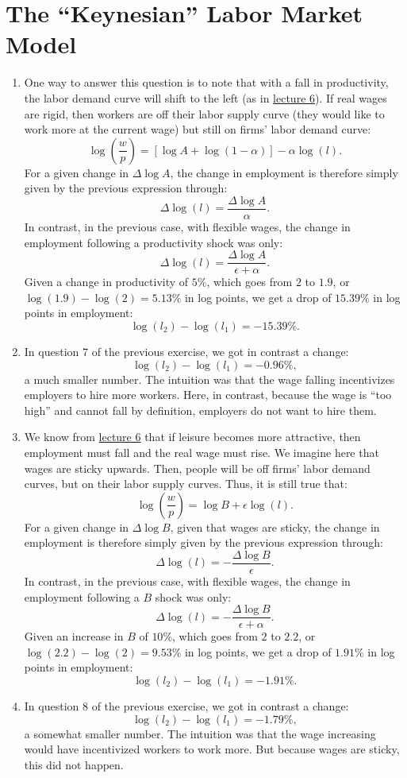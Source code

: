 \documentclass[]{book}
\theoremstyle{definition}
\theoremstyle{definition}
\theoremstyle{definition}
\theoremstyle{remark}
\begin{document}
\section{\texorpdfstring{The ``Keynesian'' Labor Market
Model}{The Keynesian Labor Market Model}}\label{the-keynesian-labor-market-model-1}

\begin{enumerate}
\def\labelenumi{\arabic{enumi}.}
\item
  One way to answer this question is to note that with a fall in
  productivity, the labor demand curve will shift to the left (as in
  \protect\hyperlink{labor-market}{lecture 6}). If real wages are rigid,
  then workers are off their labor supply curve (they would like to work
  more at the current wage) but still on firms' labor demand curve:
  \[\log\left(\frac{w}{p}\right) = \left[\log A + \log(1-\alpha)\right] -\alpha \log(l).\]
  For a given change in \(\Delta \log A\), the change in employment is
  therefore simply given by the previous expression through:
  \[\Delta \log(l)=\frac{\Delta \log A}{\alpha}.\] In contrast, in the
  previous case, with flexible wages, the change in employment following
  a productivity shock was only:
  \[\Delta \log(l) = \frac{\Delta \log A}{\epsilon+\alpha}.\] Given a
  change in productivity of \(5\%\), which goes from \(2\) to \(1.9\),
  or \(\log(1.9)-\log(2)=5.13\%\) in log points, we get a drop of
  \(15.39\%\) in log points in employment:
  \[\log(l_2)-\log(l_1)=-15.39\%.\]
\item
  In question 7 of the previous exercise, we got in contrast a change:
  \[\log(l_2)-\log(l_1)=-0.96\%,\] a much smaller number. The intuition
  was that the wage falling incentivizes employers to hire more workers.
  Here, in contrast, because the wage is ``too high'' and cannot fall by
  definition, employers do not want to hire them.
\item
  We know from \protect\hyperlink{labor-market}{lecture 6} that if
  leisure becomes more attractive, then employment must fall and the
  real wage must rise. We imagine here that wages are sticky upwards.
  Then, people will be off firms' labor demand curves, but on their
  labor supply curves. Thus, it is still true that:
  \[\log\left(\frac{w}{p}\right)=\log B + \epsilon \log(l).\] For a
  given change in \(\Delta \log B\), given that wages are sticky, the
  change in employment is therefore simply given by the previous
  expression through:
  \[\Delta \log(l)=-\frac{\Delta \log B}{\epsilon}.\] In contrast, in
  the previous case, with flexible wages, the change in employment
  following a \(B\) shock was only:
  \[\Delta \log(l) =- \frac{\Delta \log B}{\epsilon+\alpha}.\] Given an
  increase in \(B\) of \(10\%\), which goes from \(2\) to \(2.2\), or
  \(\log(2.2)-\log(2)=9.53\%\) in log points, we get a drop of
  \(1.91\%\) in log points in employment:
  \[\log(l_2)-\log(l_1)=-1.91\%.\]
\item
  In question 8 of the previous exercise, we got in contrast a change:
  \[\log(l_2)-\log(l_1)=-1.79\%,\] a somewhat smaller number. The
  intuition was that the wage increasing would have incentivized workers
  to work more. But because wages are sticky, this did not happen.
\end{enumerate}
\end{document}
